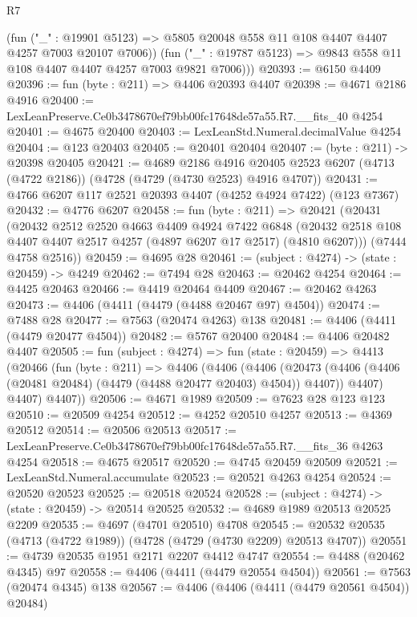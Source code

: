\begin{lexlean}{R7}
\begin{coremodule}
          (fun ("_" : @19901 @5123) =>
          @5805 @20048 @558 @11 @108 @4407 @4407 @4257 @7003 @20107 @7006))
        (fun ("_" : @19787 @5123) => @9843 @558 @11 @108 @4407 @4407 @4257 @7003 @9821 @7006)))
@20393 := @6150 @4409
@20396 := fun (byte : @211) => @4406 @20393 @4407
@20398 := @4671 @2186 @4916
@20400 := LexLeanPreserve.Ce0b3478670ef79bb00fc17648de57a55.R7.__fits_40 @4254
@20401 := @4675 @20400
@20403 := LexLeanStd.Numeral.decimalValue @4254
@20404 := @123 @20403
@20405 := @20401 @20404
@20407 := (byte : @211) -> @20398 @20405
@20421 := @4689
    @2186
    @4916
    @20405
    @2523
    @6207
    (@4713 (@4722 @2186))
    (@4728 (@4729 (@4730 @2523) @4916 @4707))
@20431 := @4766 @6207 @117 @2521 @20393 @4407 (@4252 @4924 @7422) (@123 @7367)
@20432 := @4776 @6207
@20458 := fun (byte : @211) =>
  @20421
    (@20431
      (@20432
        @2512
        @2520
        @4663
        @4409
        @4924
        @7422
        @6848
        (@20432 @2518 @108 @4407 @4407 @2517 @4257 (@4897 @6207 @17 @2517) (@4810 @6207)))
      (@7444 @4758 @2516))
@20459 := @4695 @28
@20461 := (subject : @4274) -> (state : @20459) -> @4249
@20462 := @7494 @28
@20463 := @20462 @4254
@20464 := @4425 @20463
@20466 := @4419 @20464 @4409
@20467 := @20462 @4263
@20473 := @4406 (@4411 (@4479 (@4488 @20467 @97) @4504))
@20474 := @7488 @28
@20477 := @7563 (@20474 @4263) @138
@20481 := @4406 (@4411 (@4479 @20477 @4504))
@20482 := @5767 @20400
@20484 := @4406 @20482 @4407
@20505 := fun (subject : @4274) =>
  fun (state : @20459) =>
  @4413
    (@20466
      (fun (byte : @211) =>
      @4406
        (@4406
          (@4406
            (@20473 (@4406 (@4406 (@20481 @20484) (@4479 (@4488 @20477 @20403) @4504)) @4407))
            @4407)
          @4407)
        @4407))
@20506 := @4671 @1989
@20509 := @7623 @28 @123 @123
@20510 := @20509 @4254
@20512 := @4252 @20510 @4257
@20513 := @4369 @20512
@20514 := @20506 @20513
@20517 := LexLeanPreserve.Ce0b3478670ef79bb00fc17648de57a55.R7.__fits_36 @4263 @4254
@20518 := @4675 @20517
@20520 := @4745 @20459 @20509
@20521 := LexLeanStd.Numeral.accumulate
@20523 := @20521 @4263 @4254
@20524 := @20520 @20523
@20525 := @20518 @20524
@20528 := (subject : @4274) -> (state : @20459) -> @20514 @20525
@20532 := @4689 @1989 @20513 @20525 @2209
@20535 := @4697 (@4701 @20510) @4708
@20545 := @20532 @20535 (@4713 (@4722 @1989)) (@4728 (@4729 (@4730 @2209) @20513 @4707))
@20551 := @4739 @20535 @1951 @2171 @2207 @4412 @4747
@20554 := @4488 (@20462 @4345) @97
@20558 := @4406 (@4411 (@4479 @20554 @4504))
@20561 := @7563 (@20474 @4345) @138
@20567 := @4406 (@4406 (@4411 (@4479 @20561 @4504)) @20484)

\end{coremodule}
\end{lexlean}

